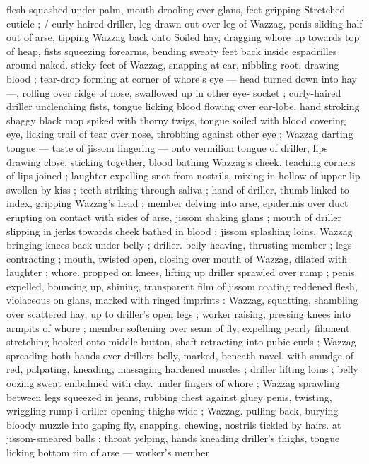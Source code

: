 flesh squashed under palm, mouth drooling over glans, feet gripping
Stretched cuticle ; / curly-haired driller, leg drawn out over leg of
Wazzag, penis sliding half out of arse, tipping Wazzag back onto
Soiled hay, dragging whore up towards top of heap, fists squeezing
forearms, bending sweaty feet back inside espadrilles around naked.
sticky feet of Wazzag, snapping at ear, nibbling root, drawing blood
; tear-drop forming at corner of whore’s eye --- head turned down
into hay ---, rolling over ridge of nose, swallowed up in other eye-
socket ; curly-haired driller unclenching fists, tongue licking blood
flowing over ear-lobe, hand stroking shaggy black mop spiked with
thorny twigs, tongue soiled with blood covering eye, licking trail of
tear over nose, throbbing against other eye ; Wazzag darting tongue
--- taste of jissom lingering --- onto vermilion tongue of driller, lips
drawing close, sticking together, blood bathing Wazzag's cheek.
teaching corners of lips joined ; laughter expelling snot from
nostrils, mixing in hollow of upper lip swollen by kiss ; teeth striking
through saliva ; hand of driller, thumb linked to index, gripping
Wazzag's head ; member delving into arse, epidermis over duct
erupting on contact with sides of arse, jissom shaking glans ; mouth
of driller slipping in jerks towards cheek bathed in blood : jissom
splashing loins, Wazzag bringing knees back under belly ; driller.
belly heaving, thrusting member ; legs contracting ; mouth, twisted
open, closing over mouth of Wazzag, dilated with laughter ; whore.
propped on knees, lifting up driller sprawled over rump ; penis.
expelled, bouncing up, shining, transparent film of jissom coating
reddened flesh, violaceous on glans, marked with ringed imprints :
Wazzag, squatting, shambling over scattered hay, up to driller's open
legs ; worker raising, pressing knees into armpits of whore ; member
softening over seam of fly, expelling pearly filament stretching
hooked onto middle button, shaft retracting into pubic curls ; Wazzag
spreading both hands over drillers belly, marked, beneath navel.
with smudge of red, palpating, kneading, massaging hardened
muscles ; driller lifting loins ; belly oozing sweat embalmed with clay.
under fingers of whore ; Wazzag sprawling between legs squeezed
in jeans, rubbing chest against gluey penis, twisting, wriggling rump
i driller opening thighs wide ; Wazzag. pulling back, burying bloody
muzzle into gaping fly, snapping, chewing, nostrils tickled by hairs.
at jissom-smeared balls ; throat yelping, hands kneading driller's
thighs, tongue licking bottom rim of arse --- worker's member
